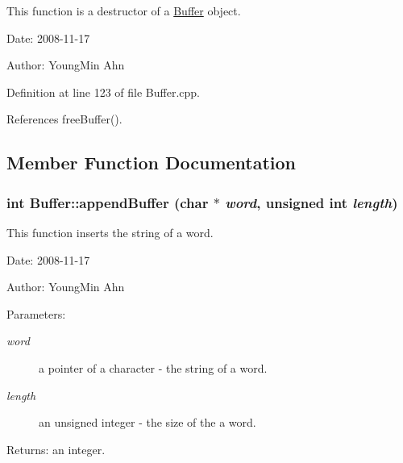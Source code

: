 This function is a destructor of a \hyperlink{classkmaOrange_1_1Buffer}{Buffer} object. 

\begin{Desc}
\item[Date:]2008-11-17 \end{Desc}
\begin{Desc}
\item[Author:]YoungMin Ahn \end{Desc}


Definition at line 123 of file Buffer.cpp.

References freeBuffer().

\subsection{Member Function Documentation}
\hypertarget{classkmaOrange_1_1Buffer_1d59bc9cc086950f9cbebba033c12c7e}{
\subsubsection[{appendBuffer}]{\setlength{\rightskip}{0pt plus 5cm}int Buffer::appendBuffer (char $\ast$ {\em word}, \/  unsigned int {\em length})}}
\label{classkmaOrange_1_1Buffer_1d59bc9cc086950f9cbebba033c12c7e}


This function inserts the string of a word. 

\begin{Desc}
\item[Date:]2008-11-17 \end{Desc}
\begin{Desc}
\item[Author:]YoungMin Ahn \end{Desc}
\begin{Desc}
\item[Parameters:]
\begin{description}
\item[{\em word}]a pointer of a character - the string of a word. \item[{\em length}]an unsigned integer - the size of the a word. \end{description}
\end{Desc}
\begin{Desc}
\item[Returns:]an integer. \end{Desc}


